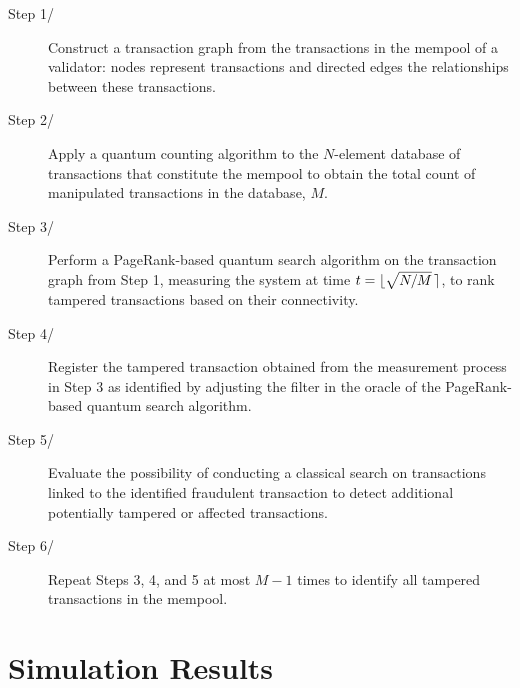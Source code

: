 \documentclass[nofootinbib,aps,prd,reprint,superscriptaddress,floatfix]{revtex4-2}
\begin{document}
\begin{description}
\item[Step 1/] Construct a transaction graph from the transactions in the mempool of a validator: nodes represent transactions and directed edges the relationships between these transactions.

\item[Step 2/] Apply a quantum counting algorithm to the $N$-element database of transactions that constitute the mempool to obtain the total count of manipulated transactions in the database, $M$.

\item[Step 3/] Perform a PageRank-based quantum search algorithm on the transaction graph from Step 1, measuring the system at time $t=\lfloor\sqrt{N/M} \hspace{1.5pt}\rceil$, to rank tampered transactions based on their connectivity. 

\item[Step 4/] Register the tampered transaction obtained from the measurement process in Step 3 as identified by adjusting the filter in the oracle of the PageRank-based quantum search algorithm.

\item[Step 5/] Evaluate the possibility of conducting a classical search on transactions linked to the identified fraudulent transaction to detect additional potentially tampered or affected transactions.

\item[Step 6/] Repeat Steps 3, 4, and 5 at most $M-1$ times to identify all tampered transactions in the mempool. 
\end{description}

\section{Simulation Results}\label{sec:Simulation_results}
\end{document}

